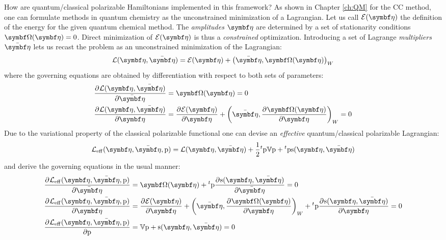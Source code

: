 How are quantum/classical polarizable Hamiltonians implemented in this
framework?
As shown in Chapter \ref{ch:QM} for the \acrshort{CC} method, one can
formulate methods in quantum chemistry as the unconstrained minimization
of a Lagrangian.\autocite{Helgaker1982-xl, Arponen1983-qt,
Helgaker1988-to, Helgaker1989-wl, Koch1990-vr, Kvaal2013-jr}
Let us call $\mathcal{E}(\vect{\eta})$ the definition of the energy
for the given quantum chemical method.
The \emph{amplitudes} $\vect{\eta}$ are determined by a set of
stationarity conditions $\mat{\Omega}(\vect{\eta}) = 0$.
Direct minimization of $\mathcal{E}(\vect{\eta})$ is thus a
\emph{constrained} optimization.
Introducing a set of Lagrange \emph{multipliers} $\bar{\vect{\eta}}$
lets us recast the problem as an unconstrained minimization of the
Lagrangian:
\begin{equation}
  \mathcal{L}(\vect{\eta}, \bar{\vect{\eta}}) =
  \mathcal{E}(\vect{\eta}) +
  \scalprod[W]{\bar{\vect{\eta}}}{\mat{\Omega}(\vect{\eta})}
\end{equation}
where the governing equations are obtained by differentiation with
respect to both sets of parameters:
\begin{subequations}
  \begin{align}
    \pderiv{\mathcal{L}(\vect{\eta}, \bar{\vect{\eta}})}{\bar{\vect{\eta}}}
    &= \mat{\Omega}(\vect{\eta}) = 0 \\
    \pderiv{\mathcal{L}(\vect{\eta}, \bar{\vect{\eta}})}{\vect{\eta}}
    &= \pderiv{\mathcal{E}(\vect{\eta})}{\vect{\eta}} +
    \scalprod[W]{\bar{\vect{\eta}}}{\pderiv{\mat{\Omega(\vect{\eta})}}{\vect{\eta}}}
    = 0
  \end{align}
\end{subequations}
Due to the  variational property of the classical polarizable functional
one can devise an \emph{effective} quantum/classical polarizable
Lagrangian:\autocite{Lipparini2016-mo}
\begin{equation}
  \mathcal{L}_\mathrm{eff}(\vect{\eta}, \bar{\vect{\eta}}, \p) =
  \mathcal{L}(\vect{\eta}, \bar{\vect{\eta}}) +
  \frac{1}{2}{}^t\p\V\p + {}^t\p\s(\vect{\eta}, \bar{\vect{\eta}})
\end{equation}
and derive the governing equations in the usual manner:
\begin{subequations}
  \begin{align}
    \pderiv{\mathcal{L}_\mathrm{eff}(\vect{\eta}, \bar{\vect{\eta}}, \p)}{\bar{\vect{\eta}}}
    &= \mat{\Omega}(\vect{\eta}) + {}^t\p\pderiv{\s(\vect{\eta}, \bar{\vect{\eta}})}{\bar{\vect{\eta}}} = 0 \\
    \pderiv{\mathcal{L}_\mathrm{eff}(\vect{\eta}, \bar{\vect{\eta}}, \p)}{\vect{\eta}}
    &= \pderiv{\mathcal{E}(\vect{\eta})}{\vect{\eta}} +
    \scalprod[W]{\bar{\vect{\eta}}}{\pderiv{\mat{\Omega(\vect{\eta})}}{\vect{\eta}}}
    + {}^t\p\pderiv{\s(\vect{\eta}, \bar{\vect{\eta}})}{\vect{\eta}}
    = 0 \\
    \pderiv{\mathcal{L}_\mathrm{eff}(\vect{\eta}, \bar{\vect{\eta}}, \p)}{\p} &=
    \V\p + \s(\vect{\eta}, \bar{\vect{\eta}}) = 0
  \end{align}
\end{subequations}
